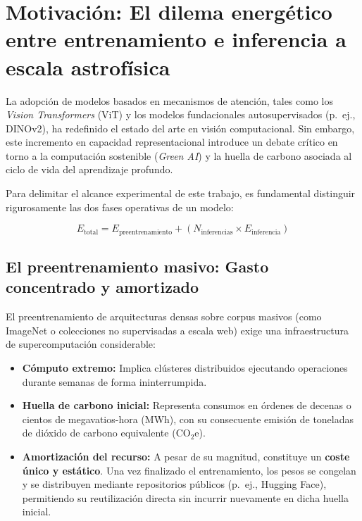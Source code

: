
\section{Motivación: El dilema energético entre entrenamiento e inferencia a escala astrofísica}
\label{sec:motivacion}

La adopción de modelos basados en mecanismos de atención, tales como los \textit{Vision Transformers} (ViT) y los modelos fundacionales autosupervisados (p.~ej., DINOv2), ha redefinido el estado del arte en visión computacional. Sin embargo, este incremento en capacidad representacional introduce un debate crítico en torno a la computación sostenible (\textit{Green AI}) y la huella de carbono asociada al ciclo de vida del aprendizaje profundo.

Para delimitar el alcance experimental de este trabajo, es fundamental distinguir rigurosamente las dos fases operativas de un modelo:

\begin{equation}
    E_{\text{total}} = E_{\text{preentrenamiento}} + \left( N_{\text{inferencias}} \times E_{\text{inferencia}} \right)
    \label{eq:coste_energetico}
\end{equation}

\subsection{El preentrenamiento masivo: Gasto concentrado y amortizado}
El preentrenamiento de arquitecturas densas sobre corpus masivos (como ImageNet o colecciones no supervisadas a escala web) exige una infraestructura de supercomputación considerable:
\begin{itemize}
    \item \textbf{Cómputo extremo:} Implica clústeres distribuidos ejecutando operaciones durante semanas de forma ininterrumpida.
    \item \textbf{Huella de carbono inicial:} Representa consumos en órdenes de decenas o cientos de megavatios-hora (MWh), con su consecuente emisión de toneladas de dióxido de carbono equivalente ($\text{CO}_2\text{e}$).
    \item \textbf{Amortización del recurso:} A pesar de su magnitud, constituye un \textbf{coste único y estático}. Una vez finalizado el entrenamiento, los pesos se congelan y se distribuyen mediante repositorios públicos (p.~ej., Hugging Face), permitiendo su reutilización directa sin incurrir nuevamente en dicha huella inicial.
\end{itemize}

